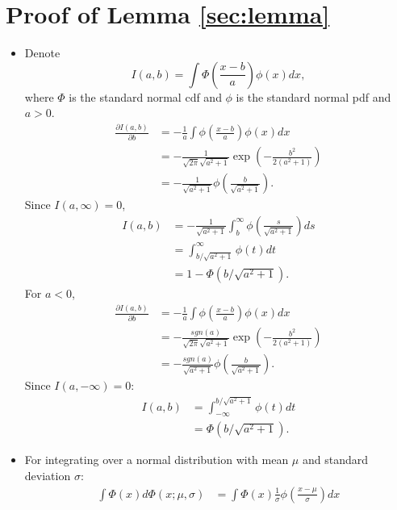 \documentclass[12pt]{article}
\begin{document}
\section{Proof of Lemma \ref{sec:lemma}}
\label{sec:proof}
\begin{itemize}
\item Denote
  \begin{displaymath}
    I(a,b) = \int \Phi \left( \frac{x-b}{a} \right)\phi(x) dx,
  \end{displaymath}
  where $\Phi$ is the standard normal cdf and $\phi$ is the standard
  normal pdf and $a > 0$.
  \begin{align*}
    \frac{\partial I(a,b)}{\partial b} & = - \frac{1}{a} \int \phi \left( \frac{x-b}{a} \right) \phi(x) dx \\
    & = - \frac{1}{\sqrt{2 \pi} \sqrt{a^2+1}} \exp \left( - \frac{b^2}{2(a^2+1)} \right)\\
    & = -\frac{1}{\sqrt{a^2+1}} \phi \left( \frac{b}{\sqrt{a^2+1}}
    \right).
  \end{align*}
  Since $I(a, \infty) = 0$,
  \begin{align}
    I(a,b) &= - \frac{1}{\sqrt{a^2+1}} \int_b^{\infty} \phi \left( \frac{s}{\sqrt{a^2+1}} \right) ds \nonumber \\
    &= \int_{b/\sqrt{a^2+1}}^{\infty} \phi(t) dt \nonumber\\
    \label{eq:int}
    & = 1- \Phi(b/\sqrt{a^2+1}).
  \end{align}
  For $a < 0$,
  \begin{align*}
    \frac{\partial I(a,b)}{\partial b} & = - \frac{1}{a} \int \phi \left( \frac{x-b}{a} \right) \phi(x) dx \\
    & = - \frac{sgn(a)}{\sqrt{2 \pi} \sqrt{a^2+1}} \exp \left( - \frac{b^2}{2(a^2+1)} \right)\\
    & = -\frac{sgn(a)}{\sqrt{a^2+1}} \phi \left(
      \frac{b}{\sqrt{a^2+1}} \right).
  \end{align*}
  Since $I(a, -\infty) = 0$:
  \begin{align}
    I(a,b) &= \int^{b/\sqrt{a^2+1}}_{-\infty} \phi(t) dt \nonumber\\
    \label{eq:intneg}
    & = \Phi(b/\sqrt{a^2+1}).
  \end{align}
\item For integrating over a normal distribution with mean $\mu$ and
  standard deviation $\sigma$:
  \begin{align*}
    \int \Phi(x)d\Phi(x; \mu, \sigma) & = \int \Phi(x) \frac{1}{\sigma} \phi \left( \frac{x-\mu}{\sigma} \right) dx \\

\end{align*}
\end{itemize}
\end{document}
